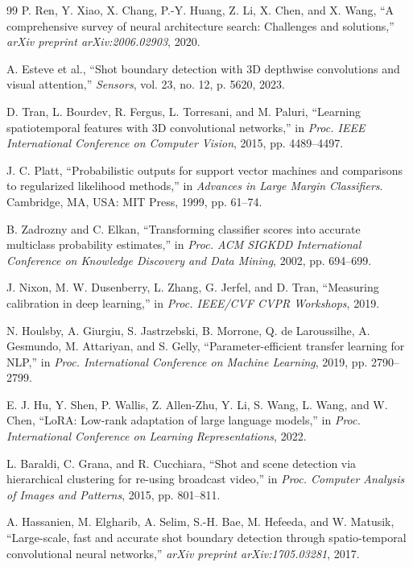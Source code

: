 \documentclass[journal]{IEEEtran}
\begin{document}
\begin{thebibliography}{99}
P. Ren, Y. Xiao, X. Chang, P.-Y. Huang, Z. Li, X. Chen, and X. Wang, ``A comprehensive survey of neural architecture search: Challenges and solutions,'' \emph{arXiv preprint arXiv:2006.02903}, 2020.

A. Esteve et al., ``Shot boundary detection with 3D depthwise convolutions and visual attention,'' \emph{Sensors}, vol. 23, no. 12, p. 5620, 2023.

D. Tran, L. Bourdev, R. Fergus, L. Torresani, and M. Paluri, ``Learning spatiotemporal features with 3D convolutional networks,'' in \emph{Proc. IEEE International Conference on Computer Vision}, 2015, pp. 4489--4497.

J. C. Platt, ``Probabilistic outputs for support vector machines and comparisons to regularized likelihood methods,'' in \emph{Advances in Large Margin Classifiers}. Cambridge, MA, USA: MIT Press, 1999, pp. 61--74.

B. Zadrozny and C. Elkan, ``Transforming classifier scores into accurate multiclass probability estimates,'' in \emph{Proc. ACM SIGKDD International Conference on Knowledge Discovery and Data Mining}, 2002, pp. 694--699.

J. Nixon, M. W. Dusenberry, L. Zhang, G. Jerfel, and D. Tran, ``Measuring calibration in deep learning,'' in \emph{Proc. IEEE/CVF CVPR Workshops}, 2019.

N. Houlsby, A. Giurgiu, S. Jastrzebski, B. Morrone, Q. de Laroussilhe, A. Gesmundo, M. Attariyan, and S. Gelly, ``Parameter-efficient transfer learning for NLP,'' in \emph{Proc. International Conference on Machine Learning}, 2019, pp. 2790--2799.

E. J. Hu, Y. Shen, P. Wallis, Z. Allen-Zhu, Y. Li, S. Wang, L. Wang, and W. Chen, ``LoRA: Low-rank adaptation of large language models,'' in \emph{Proc. International Conference on Learning Representations}, 2022.

L. Baraldi, C. Grana, and R. Cucchiara, ``Shot and scene detection via hierarchical clustering for re-using broadcast video,'' in \emph{Proc. Computer Analysis of Images and Patterns}, 2015, pp. 801--811.

A. Hassanien, M. Elgharib, A. Selim, S.-H. Bae, M. Hefeeda, and W. Matusik, ``Large-scale, fast and accurate shot boundary detection through spatio-temporal convolutional neural networks,'' \emph{arXiv preprint arXiv:1705.03281}, 2017.


\end{thebibliography}
\end{document}
